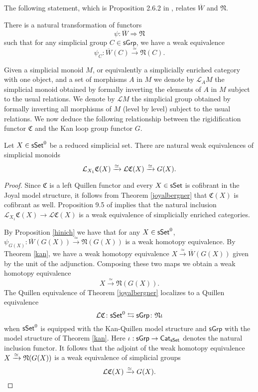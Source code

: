 The following statement, which is Proposition 2.6.2 in \cite{hinich2007deformation}, relates $\overline{W}$ and $\mathfrak{N}$.

\begin{proposition}\label{hinich} There is a natural transformation of functors $$\psi: \overline{W} \Longrightarrow \mathfrak{N}$$ such that for any simplicial group $C \in \mathsf{sGrp}$, we have a weak equivalence
$$\psi_C: \overline{W}(C) \xrightarrow{\simeq} \mathfrak{N}(C).$$
\end{proposition} 

 Given a simplicial monoid $M$, or equivalently a simplicially enriched category with one object, and a set of morphisms $A$ in $M$ we denote by $\mathcal{L}_A M$ the simplicial monoid obtained by formally inverting the elements of $A$ in $M$ subject to the usual relations. We denote by $\mathcal{L}M$ the simplicial group obtained by formally inverting all morphisms of $M$ (level by level) subject to the usual relations. We now deduce the following relationship between the rigidification functor $\mathfrak{C}$ and the Kan loop group functor $G$.

\begin{proposition}\label{CandG} Let $X \in \mathsf{sSet}^0$ be a reduced simplicial set. There are natural weak equivalences of simplicial monoids
$$\mathcal{L}_{X_1} \mathfrak{C}(X) \xrightarrow{\simeq} \mathcal{L}\mathfrak{C}(X) \xrightarrow{\simeq} G(X).$$
\end{proposition}

\begin{proof}
Since $\mathfrak{C}$ is a left Quillen functor and every $X \in \mathsf{sSet}$ is cofibrant in the Joyal model structure, it follows from Theorem \ref{joyalbergner} that $\mathfrak{C}(X)$ is cofibrant as well. Proposition 9.5 of \cite{dwyer1980simplicial} implies that the natural inclusion $\mathcal{L}_{X_1} \mathfrak{C}(X) \to \mathcal{L}\mathfrak{C}(X)$ is a weak equivalence of simplicially enriched categories. 

By Proposition \ref{hinich} we have that for any $X \in \mathsf{sSet}^0$, $\psi_{G(X)}: \overline{W}(G(X)) \xrightarrow{\simeq} \mathfrak{N}(G(X))$ is a weak homotopy equivalence. By Theorem \ref{kan}, we have a weak homotopy equivalence $X \xrightarrow{\simeq} \overline{W}(G(X))$ given by the unit of the adjunction. Composing these two maps we obtain a weak homotopy equivalence
$$X \xrightarrow{\simeq} \mathfrak{N}(G(X)).$$ 
The Quillen equivalence of Theorem \ref{joyalbergner} localizes to a Quillen equivalence
$$\mathcal{L} \mathfrak{C} \colon \mathsf{sSet}^0 \leftrightarrows \mathsf{sGrp} \colon \mathfrak{N}\iota$$
when $\mathsf{sSet}^0$ is equipped with the Kan-Quillen model structure and $\mathsf{sGrp}$ with the model structure of Theorem \ref{kan}. Here $\iota: \mathsf{sGrp} \to \mathsf{Cat}_{\mathsf{sSet}}$ denotes the natural inclusion functor. It follows that the adjoint of the weak homotopy equivalence $X \xrightarrow{\simeq} \mathfrak{N}(G(X))$ is a weak equivalence of simplicial groups
$$\mathcal{L}\mathfrak{C}(X) \xrightarrow{\simeq} G(X).$$ 
\end{proof}


